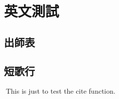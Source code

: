 
\chapter{英文測試}

\section{出師表}



\section{短歌行}

This is just to test \cite{Krasnogor2004e} the cite function.
